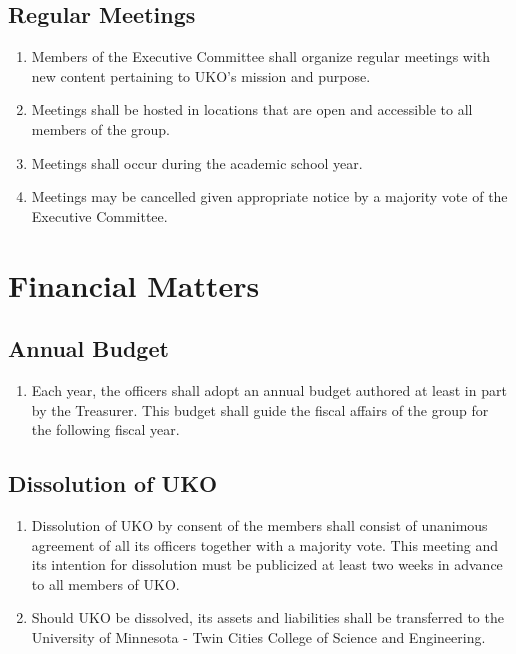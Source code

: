 \documentclass[12pt,executivepaper]{article}
\begin{document}
\subsection{Regular Meetings}
\begin{enumerate}
    \item Members of the Executive Committee shall organize regular meetings
          with new content pertaining to UKO's mission and purpose.
    \item Meetings shall be hosted in locations that are open and accessible
          to all members of the group.
    \item Meetings shall occur during the academic school year.
    \item Meetings may be cancelled given appropriate notice by a majority
          vote of the Executive Committee.
\end{enumerate}

\section{Financial Matters}

\subsection{Annual Budget}
\begin{enumerate}
    \item Each year, the officers shall adopt an annual budget authored at least in
          part by the Treasurer. This budget shall guide the fiscal affairs of the
          group for the following fiscal year.
\end{enumerate}

\subsection{Dissolution of UKO}
\begin{enumerate}
    \item Dissolution of UKO by consent of the members shall consist of unanimous
          agreement of all its officers together with a majority vote.
          This meeting and its intention for dissolution must be publicized at least
          two weeks in advance to all members of UKO.
    \item Should UKO be dissolved, its assets and liabilities shall be transferred
          to the University of Minnesota - Twin Cities College of Science and Engineering.
\end{enumerate}
\end{document}
